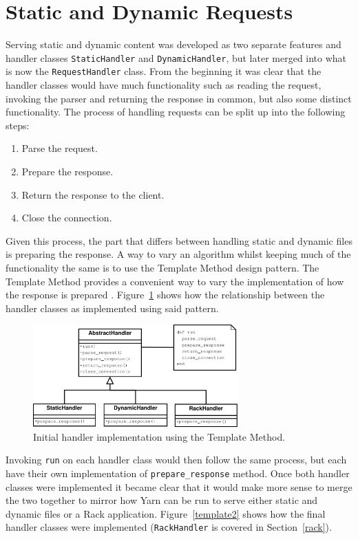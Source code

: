\section{Static and Dynamic Requests}
Serving static and dynamic content was developed as two separate features and
handler classes \texttt{StaticHandler} and \texttt{DynamicHandler}, but
later merged into what is now the \texttt{RequestHandler} class. From the
beginning it was clear that the handler classes would have much functionality
such as reading the request, invoking the parser and returning the response in
common, but also some distinct functionality. The process of handling requests can be split up into
the following steps:

\begin{enumerate}
  \item Parse the request.
  \item Prepare the response.
  \item Return the response to the client.
  \item Close the connection.
\end{enumerate}

Given this process, the part that differs between handling static and dynamic
files is preparing the response. 
 A way to vary an algorithm
whilst keeping much of the functionality the same is to use the Template
Method design pattern.
The Template Method provides a
convenient way to vary the implementation of how the response is prepared
\cite{design_patterns}.  Figure~\ref{template} shows how the relationship
between the handler classes as implemented using said pattern.

\begin{figure}[htb]
  \centering
  \includegraphics[width=0.7\textwidth]{diagrams/handlers.pdf}
  \caption{Initial handler implementation using the Template Method.}
  \label{template}
\end{figure}

Invoking \texttt{run} on each handler class would then follow the same process, but
each have their own implementation of \texttt{prepare\_response} method. Once
both handler classes were implemented it became clear that it would make more
sense to merge the two together to mirror how Yarn can be run to serve either
static and dynamic files or a Rack application. Figure~\ref{template2} shows
how the final handler classes were implemented (\texttt{RackHandler} is
covered in Section~\ref{rack}).

